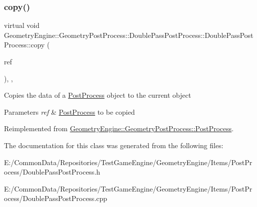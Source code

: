 \mbox{\label{class_geometry_engine_1_1_geometry_post_process_1_1_double_pass_post_process_1_1_double_pass_post_process_a28b760437951a4676b55efb491358e8f}} 
\subsubsection{\texorpdfstring{copy()}{copy()}}
{\footnotesize\ttfamily virtual void Geometry\+Engine\+::\+Geometry\+Post\+Process\+::\+Double\+Pass\+Post\+Process\+::\+Double\+Pass\+Post\+Process\+::copy (\begin{DoxyParamCaption}\item[{const \mbox{\hyperlink{class_geometry_engine_1_1_geometry_post_process_1_1_post_process}{Post\+Process}} \&}]{ref }\end{DoxyParamCaption})\hspace{0.3cm}{\ttfamily [inline]}, {\ttfamily [protected]}, {\ttfamily [virtual]}}

Copies the data of a \mbox{\hyperlink{class_geometry_engine_1_1_geometry_post_process_1_1_post_process}{Post\+Process}} object to the current object 
\begin{DoxyParams}{Parameters}
{\em ref} & \mbox{\hyperlink{class_geometry_engine_1_1_geometry_post_process_1_1_post_process}{Post\+Process}} to be copied \\
\hline
\end{DoxyParams}


Reimplemented from \mbox{\hyperlink{class_geometry_engine_1_1_geometry_post_process_1_1_post_process_aba093c175b228894204e785a5a54e6e9}{Geometry\+Engine\+::\+Geometry\+Post\+Process\+::\+Post\+Process}}.



The documentation for this class was generated from the following files\+:\begin{DoxyCompactItemize}
\item 
E\+:/\+Common\+Data/\+Repositories/\+Test\+Game\+Engine/\+Geometry\+Engine/\+Items/\+Post\+Process/Double\+Pass\+Post\+Process.\+h\item 
E\+:/\+Common\+Data/\+Repositories/\+Test\+Game\+Engine/\+Geometry\+Engine/\+Items/\+Post\+Process/Double\+Pass\+Post\+Process.\+cpp\end{DoxyCompactItemize}
